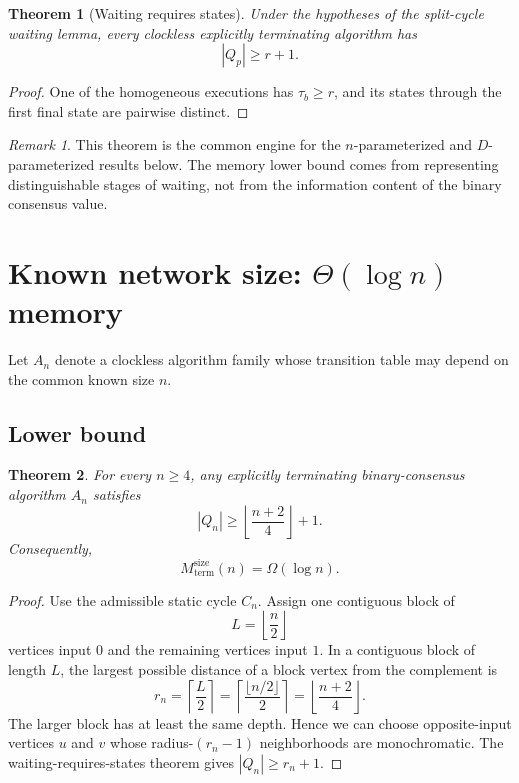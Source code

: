 \documentclass[11pt]{article}
\newtheorem{theorem}{Theorem}
\theoremstyle{remark}
\newtheorem{remark}{Remark}
\begin{document}
\begin{theorem}[Waiting requires states]
Under the hypotheses of the split-cycle waiting lemma, every clockless explicitly terminating algorithm has
\[
|Q_p|\ge r+1.
\]
\end{theorem}
\begin{proof}
One of the homogeneous executions has $\tau_b\ge r$, and its states through the first final state are pairwise distinct.
\end{proof}

\begin{remark}
This theorem is the common engine for the $n$-parameterized and $D$-parameterized results below. The memory lower bound comes from representing distinguishable stages of waiting, not from the information content of the binary consensus value.
\end{remark}

\section{Known network size: \texorpdfstring{$\Theta(\log n)$}{Theta(log n)} memory}
Let $A_n$ denote a clockless algorithm family whose transition table may depend on the common known size $n$.

\subsection{Lower bound}
\begin{theorem}
For every $n\ge4$, any explicitly terminating binary-consensus algorithm $A_n$ satisfies
\[
|Q_n|\ge \left\lfloor\frac{n+2}{4}\right\rfloor+1.
\]
Consequently,
\[
M_{\mathrm{term}}^{\mathrm{size}}(n)=\Omega(\log n).
\]
\end{theorem}
\begin{proof}
Use the admissible static cycle $C_n$. Assign one contiguous block of
\[
L=\left\lfloor\frac n2\right\rfloor
\]
vertices input $0$ and the remaining vertices input $1$. In a contiguous block of length $L$, the largest possible distance of a block vertex from the complement is
\[
r_n=\left\lceil\frac L2\right\rceil
=\left\lceil\frac{\lfloor n/2\rfloor}{2}\right\rceil
=\left\lfloor\frac{n+2}{4}\right\rfloor.
\]
The larger block has at least the same depth. Hence we can choose opposite-input vertices $u$ and $v$ whose radius-$(r_n-1)$ neighborhoods are monochromatic. The waiting-requires-states theorem gives $|Q_n|\ge r_n+1$.
\end{proof}
\end{document}
